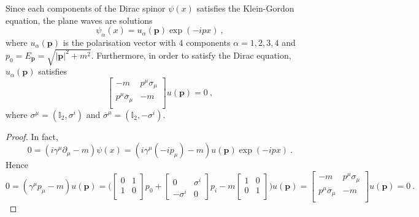     Since each components of the Dirac spinor $\psi(x)$ satisfies the Klein-Gordon equation, the plane waves are solutions 
    \begin{equation*}
        \psi_\alpha (x) = u_\alpha (\mathbf p) \exp(- i p x) ~,
    \end{equation*}
    where $u_\alpha (\mathbf p)$ is the polarisation vector with $4$ components $\alpha = 1,2,3,4$ and $p_0 = E_{\mathbf p} = \sqrt{|\mathbf p|^2 + m^2}$. Furthermore, in order to satisfy the Dirac equation, $u_\alpha (\mathbf p)$ satisfies 
    \begin{equation}\label{cond}
        \begin{bmatrix}
            - m & p^\mu \sigma_\mu \\ p^\mu \overline \sigma_\mu & -m \\
        \end{bmatrix} u (\mathbf p) = 0 ~,
    \end{equation}
    where $\sigma^\mu = (\mathbb I_2, \sigma^i)$ and $\overline \sigma^\mu = (\mathbb I_2, - \sigma^i)$.
    \begin{proof}
        In fact, 
        \begin{equation*}
            0 = (i \gamma^\mu \partial_\mu - m) \psi(x) = (i \gamma^\mu (- i p_\mu ) - m) u(\mathbf p) \exp(- i p x) ~.
        \end{equation*}
        Hence 
        \begin{equation*}
            0 = (\gamma^\mu  p_\mu - m) u(\mathbf p) = \Big ( 
            \begin{bmatrix}
                0 & 1 \\ 1 & 0 \\ 
            \end{bmatrix} p_0 + \begin{bmatrix}
                0 & \sigma^i \\ - \sigma^i & 0
            \end{bmatrix} p_i  - m \begin{bmatrix}
                1 & 0 \\ 0 & 1 \\
            \end{bmatrix} \Big) u (\mathbf p) = \begin{bmatrix}
                - m & p^\mu \sigma_\mu \\ p^\mu \overline \sigma_\mu & -m \\
            \end{bmatrix} u (\mathbf p) = 0 ~. 
        \end{equation*}
    \end{proof}

